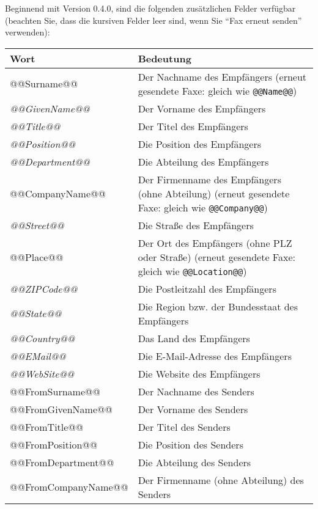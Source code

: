 \documentclass[a4paper,10pt,halfparskip,noparindent]{scrartcl}
\begin{document}
Beginnend mit Version 0.4.0, sind die folgenden zusätzlichen Felder verfügbar (beachten Sie, dass die kursiven Felder leer sind, wenn Sie "`Fax erneut senden"' verwenden):
\begin{center}
\begin{tabular}{|l|p{}|}
\hline
\bfseries Wort & \bfseries Bedeutung \\
\hline\hline
\ttfamily @@Surname@@ & Der Nachname des Empfängers (erneut gesendete Faxe: gleich wie \texttt{@@Name@@}) \\\hline
\ttfamily\itshape @@GivenName@@ & Der Vorname des Empfängers \\\hline
\ttfamily\itshape @@Title@@ & Der Titel des Empfängers \\\hline
\ttfamily\itshape @@Position@@ & Die Position des Empfängers \\\hline
\ttfamily\itshape @@Department@@ & Die Abteilung des Empfängers\\\hline
\ttfamily @@CompanyName@@ & Der Firmenname des Empfängers (ohne Abteilung) (erneut gesendete Faxe: gleich wie  \texttt{@@Company@@})\\\hline
\ttfamily\itshape @@Street@@ & Die Straße des Empfängers \\\hline
\ttfamily @@Place@@ & Der Ort des Empfängers (ohne PLZ oder Straße) (erneut gesendete Faxe: gleich wie \texttt{@@Location@@})\\\hline
\ttfamily\itshape @@ZIPCode@@ & Die Postleitzahl des Empfängers \\\hline
\ttfamily\itshape @@State@@ & Die Region bzw. der Bundesstaat des Empfängers\\\hline
\ttfamily\itshape @@Country@@ & Das Land des Empfängers\\\hline
\ttfamily\itshape @@EMail@@ & Die E-Mail-Adresse des Empfängers\\\hline
\ttfamily\itshape @@WebSite@@ & Die Website des Empfängers\\\hline\hline
\ttfamily @@FromSurname@@ & Der Nachname des Senders \\\hline
\ttfamily @@FromGivenName@@ & Der Vorname des Senders \\\hline
\ttfamily @@FromTitle@@ & Der Titel des Senders \\\hline
\ttfamily @@FromPosition@@ & Die Position des Senders \\\hline
\ttfamily @@FromDepartment@@ & Die Abteilung des Senders\\\hline
\ttfamily @@FromCompanyName@@ & Der Firmenname (ohne Abteilung) des Senders\\\hline

\end{tabular}
\end{center}
\end{document}
